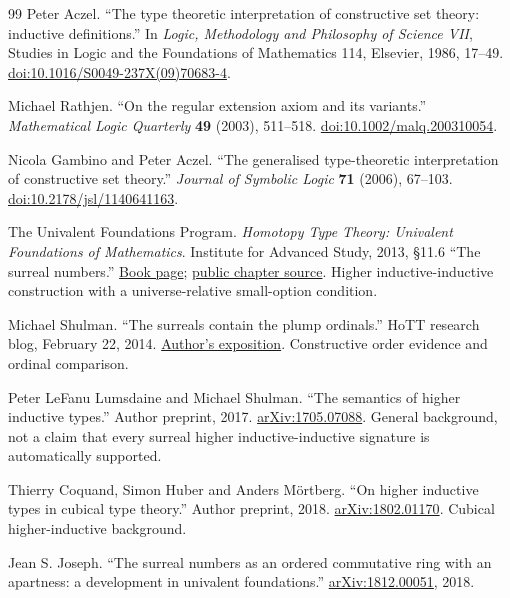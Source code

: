 \documentclass[11pt,letterpaper]{article}
\numberwithin{equation}{section}
\theoremstyle{definition}
\theoremstyle{remark}
\begin{document}
\begin{thebibliography}{99}
Peter Aczel. ``The type theoretic interpretation of constructive set theory:
inductive definitions.'' In \emph{Logic, Methodology and Philosophy of Science
VII}, Studies in Logic and the Foundations of Mathematics 114, Elsevier, 1986,
17--49.
\href{https://doi.org/10.1016/S0049-237X(09)70683-4}{doi:10.1016/S0049-237X(09)70683-4}.

Michael Rathjen. ``On the regular extension axiom and its variants.''
\emph{Mathematical Logic Quarterly} \textbf{49} (2003), 511--518.
\href{https://doi.org/10.1002/malq.200310054}{doi:10.1002/malq.200310054}.

Nicola Gambino and Peter Aczel. ``The generalised type-theoretic interpretation
of constructive set theory.'' \emph{Journal of Symbolic Logic} \textbf{71}
(2006), 67--103.
\href{https://doi.org/10.2178/jsl/1140641163}{doi:10.2178/jsl/1140641163}.

The Univalent Foundations Program. \emph{Homotopy Type Theory: Univalent
Foundations of Mathematics}. Institute for Advanced Study, 2013, \S11.6 ``The
surreal numbers.'' \href{https://homotopytypetheory.org/book/}{Book page};
\href{https://github.com/HoTT/book/blob/master/reals.tex}{public chapter source}.
Higher inductive-inductive construction with a universe-relative small-option
condition.

Michael Shulman. ``The surreals contain the plump ordinals.'' HoTT research blog,
February 22, 2014.
\href{https://homotopytypetheory.org/2014/02/22/surreals-plump-ordinals/}{Author's exposition}.
Constructive order evidence and ordinal comparison.

Peter LeFanu Lumsdaine and Michael Shulman. ``The semantics of higher inductive
types.'' Author preprint, 2017.
\href{https://arxiv.org/abs/1705.07088}{arXiv:1705.07088}. General background,
not a claim that every surreal higher inductive-inductive signature is
automatically supported.

Thierry Coquand, Simon Huber and Anders M\"ortberg. ``On higher inductive types
in cubical type theory.'' Author preprint, 2018.
\href{https://arxiv.org/abs/1802.01170}{arXiv:1802.01170}. Cubical
higher-inductive background.

Jean S. Joseph. ``The surreal numbers as an ordered commutative ring with an
apartness: a development in univalent foundations.''
\href{https://arxiv.org/abs/1812.00051}{arXiv:1812.00051}, 2018.


\end{thebibliography}
\end{document}
